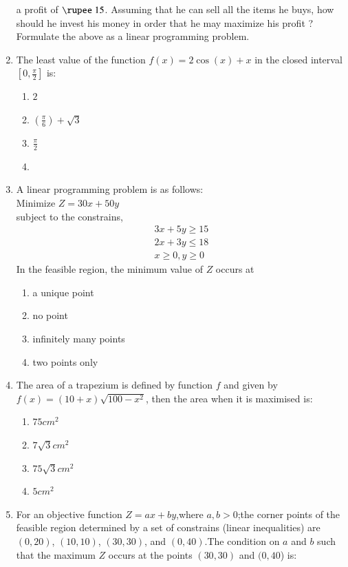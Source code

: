 \documentclass{article}
\begin{document}
\begin{enumerate}
a profit of $\rupee~ 15$. Assuming that he can sell all the items he buys, how
should he invest his money in order that he may maximize his profit ?
Formulate the above as a linear programming problem.
\item The least value of the function $f(x)=2\cos(x) + x$ in the closed interval $\left[{0,\frac{\pi}{2}}\right]$ is: 
\begin{enumerate}
    \item  $2$
    \item  $\left(\frac{\pi}{6}\right) + \sqrt{3}$
    \item  $\frac{\pi}{2}$
    \item  {}
\end{enumerate}
\item A linear programming problem is as follows:\\
Minimize $Z=30x+50y$\\
subject to the constrains,\\
\begin{align}
    3x+5y \geq 15\\
    2x+3y \leq 18\\
    x \geq 0,y \geq 0
    \end{align}
In the feasible region, the minimum value of $Z$ occurs at 
\begin{enumerate}
    \item a unique point 
    \item no point
    \item infinitely many points 
    \item two points only
\end{enumerate}
\item The area of a trapezium is defined by function $f$
and given by $f(x)=(10+x)\sqrt{100-x^2}$, then the area when it is maximised is:\\
\begin{enumerate}
    \item $75cm^2$
    \item $7\sqrt{3}cm^2$
    \item $75\sqrt{3}cm^2$
    \item $5cm^2$
\end{enumerate}
\item For an objective function $Z=ax+by$,where $a,b>0$;the corner points of the feasible region determined by a set of constrains (linear inequalities) are $(0,20)$, $(10,10)$, $(30,30)$, and $(0,40)$.The condition on $a$ and $b$ such that the maximum $Z$ occurs at the points $(30,30)$ and $(0,40$) is: 

\end{enumerate}
\end{document}

